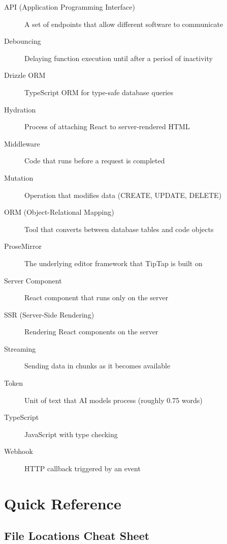 \documentclass[11pt,a4paper]{article}
\begin{document}
\begin{description}
    \item[API (Application Programming Interface)] A set of endpoints that allow different software to communicate
    
    \item[Debouncing] Delaying function execution until after a period of inactivity
    
    \item[Drizzle ORM] TypeScript ORM for type-safe database queries
    
    \item[Hydration] Process of attaching React to server-rendered HTML
    
    \item[Middleware] Code that runs before a request is completed
    
    \item[Mutation] Operation that modifies data (CREATE, UPDATE, DELETE)
    
    \item[ORM (Object-Relational Mapping)] Tool that converts between database tables and code objects
    
    \item[ProseMirror] The underlying editor framework that TipTap is built on
    
    \item[Server Component] React component that runs only on the server
    
    \item[SSR (Server-Side Rendering)] Rendering React components on the server
    
    \item[Streaming] Sending data in chunks as it becomes available
    
    \item[Token] Unit of text that AI models process (roughly 0.75 words)
    
    \item[TypeScript] JavaScript with type checking
    
    \item[Webhook] HTTP callback triggered by an event
\end{description}


\section{Quick Reference}

\subsection{File Locations Cheat Sheet}
\end{document}
